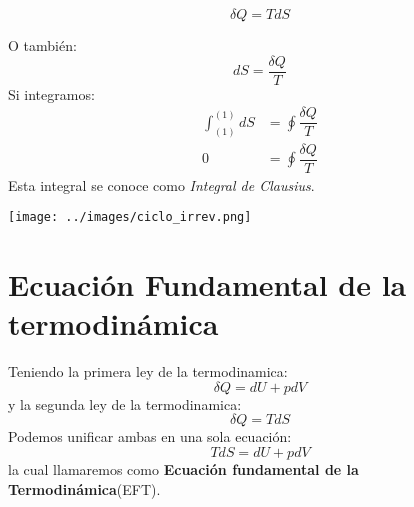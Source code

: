 \documentclass[../main]{subfiles}
\begin{document}
\begin{equation}
    \delta Q=TdS
\end{equation}

\begin{minipage}{0.49\textwidth}
    O también:
    \begin{equation}
        dS= \dfrac{\delta Q}{T}
    \end{equation}
    Si integramos:
    \begin{align}
        \int_{(1)}^{(1)}dS & =\oint \dfrac{\delta Q}{T}  \\
        0                  & = \oint \dfrac{\delta Q}{T}
    \end{align}
    Esta integral se conoce como \textit{Integral de Clausius}.
\end{minipage}
\begin{minipage}{0.49\textwidth}
    \begin{center}
        \texttt{[image: ../images/ciclo\_irrev.png]}
    \end{center}
\end{minipage}
\chapter{Ecuación Fundamental de la termodinámica}
Teniendo la primera ley de la termodinamica:
\begin{equation}
    \delta Q=dU+pdV
\end{equation}
y la segunda ley de la termodinamica:
\begin{equation}
    \delta Q=TdS
\end{equation}
Podemos unificar ambas en una sola ecuación:
\begin{equation}
    TdS=dU+pdV
\end{equation}
la cual llamaremos como \textbf{Ecuación fundamental de la Termodinámica}(EFT).
\end{document}
